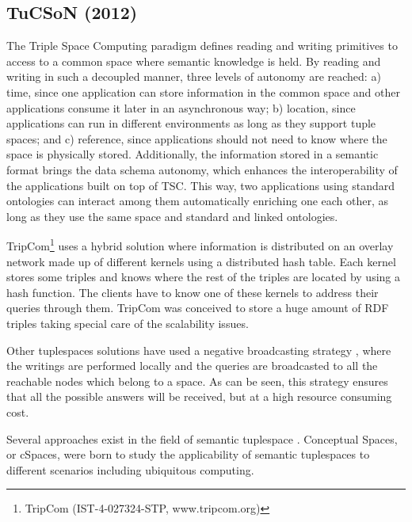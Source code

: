\subsection{TuCSoN (2012)}


The Triple Space Computing paradigm defines reading and writing primitives to access to a common space where semantic
knowledge is held. By reading and writing in such a decoupled manner, three levels of autonomy are reached: a) time,
since one application can store information in the common space and other applications consume it later in an
asynchronous way; b) location, since applications can run in different environments as long as they support tuple
spaces; and c) reference, since applications should not need to know where the space is physically stored. Additionally,
the information stored in a semantic format brings the data schema autonomy, which enhances the interoperability of the
applications built on top of TSC. This way, two applications using standard ontologies can interact among them
automatically enriching one each other, as long as they use the same space and standard and linked ontologies.



TripCom\footnote{TripCom (IST-4-027324-STP, www.tripcom.org)} uses a hybrid solution where information is distributed on
an overlay network made up of different kernels using a distributed hash table. Each kernel stores some triples and
knows where the rest of the triples are located by using a hash function. The clients have to know one of these
kernels to address their queries through them. TripCom was conceived to store a huge amount of RDF triples taking
special care of the scalability issues.

Other tuplespaces solutions have used a negative broadcasting strategy
\cite{krummenacher_open_2009,murphy_transiently_2006,gomez-goiri_semantic_2011}, where the writings are
performed locally and the queries are broadcasted to all the reachable nodes which belong to a space. As can be seen,
this strategy ensures that all the possible answers will be received, but at a high resource consuming cost.

Several approaches exist in the field of semantic tuplespace \cite{nixon_tuplespace-based_2008}.
Conceptual Spaces, or cSpaces, were born to study the applicability of semantic tuplespaces to different scenarios
including ubiquitous computing. 

